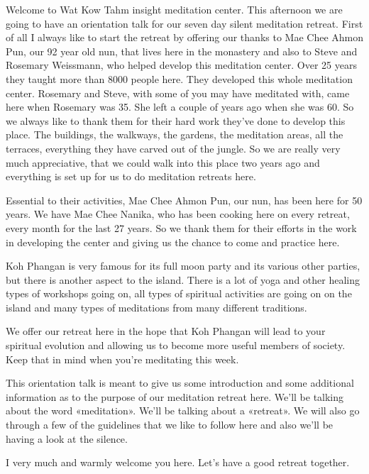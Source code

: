 \documentclass[letterpaper,10pt,english]{sphinxmanual}
\begin{document}
\sphinxAtStartPar
{}   Welcome to Wat Kow Tahm insight meditation center. This afternoon
we are going to have an orientation talk for our seven day silent meditation
retreat. First of all I always like to start the retreat by offering our thanks to
Mae Chee Ahmon Pun, our 92 year old nun, that lives here in the monastery and also to Steve and Rosemary Weissmann, who helped develop this
meditation center. Over 25 years they taught more than 8000 people here.
They  developed  this  whole  meditation  center.  Rosemary  and  Steve,  with
some of you may have meditated with, came here when Rosemary was 35.
She left a couple of years ago when she was 60. So we always like to thank
them for their hard work they’ve done to develop this place. The buildings,
the walkways, the gardens, the meditation areas, all the terraces, everything
they have carved out of the jungle. So we are really very much appreciative,
that we could walk into this place two years ago and everything is set up for
us to do meditation retreats here.

\sphinxAtStartPar
Essential to their activities, Mae Chee Ahmon Pun, our nun, has been
here for 50 years. We have Mae Chee Nanika, who has been cooking here on
every retreat, every month for the last 27 years. So we thank them for their
efforts in the work in developing the center and giving us the chance to come
and practice here.

\sphinxAtStartPar
Koh  Phangan  is  very  famous  for  its  full  moon  party  and  its  various
   other parties, but there is another aspect to the island. There is a lot of yoga
and other healing types of workshops going on, all types of spiritual activities are going on on the island and many types of meditations from many
different traditions.

\sphinxAtStartPar
We  offer  our  retreat  here  in  the  hope  that  Koh  Phangan  will  lead  to
your spiritual evolution and allowing us to become more useful members of
society. Keep that in mind when you’re meditating this week.

\sphinxAtStartPar
This orientation talk is meant to give us some introduction and some
additional information as to the purpose of our meditation retreat here. We’ll
be talking about the word «meditation». We’ll be talking about a «retreat».
We will also go through a few of the guidelines that we like to follow here
and also we’ll be having a look at the silence.

\sphinxAtStartPar
I very much and warmly welcome you here. Let’s have a good retreat
together.
\end{document}
